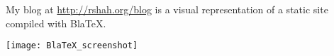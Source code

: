 
  My blog at \url{http://rshah.org/blog} is a visual representation of a static site compiled with BlaTeX.

  \centerline{\texttt{[image: BlaTeX\_screenshot]}}